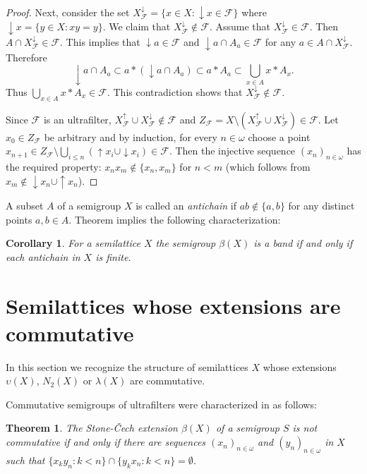 \documentclass{amsart}
\newtheorem{theorem}[lem]{Theorem}
\newtheorem{corollary}[lem]{Corollary}
\theoremstyle{definition}
\begin{document}
\begin{proof}
Next, consider the set $X^{\downarrow}_{\mathcal {F}}=\{x\in X:
{\downarrow}x\in{\mathcal {F}}\}$ where ${\downarrow}x=\{y\in X:xy=y\}$. We claim that
$X^{\downarrow}_{\mathcal {F}}\notin{\mathcal {F}}$. Assume that
$X^{\downarrow}_{\mathcal {F}}\in{\mathcal {F}}$. Then $A\cap X^{\downarrow}_{\mathcal {F}}\in{\mathcal {F}}$.
This implies that ${\downarrow}a\in{\mathcal {F}}$ and ${\downarrow}a\cap
A_a\in{\mathcal {F}}$ for any $a\in A\cap X^{\downarrow}_{\mathcal {F}}$. Therefore
$${\downarrow}a\cap A_a\subset a*({\downarrow}a\cap A_a)\subset a*A_a\subset   \bigcup_{x\in A}x*A_x.$$ Thus
$\bigcup_{x\in A}x{*}A_x\in{\mathcal {F}}$. This contradiction shows that $X^{\downarrow}_{\mathcal {F}}\notin{\mathcal {F}}$.

Since ${\mathcal {F}}$ is an ultrafilter, $X^{\uparrow}_{\mathcal {F}}\cup X^{\downarrow}_{\mathcal {F}}\notin{\mathcal {F}}$ and
$Z_{\mathcal {F}}=X\setminus(X^{\uparrow}_{\mathcal {F}}\cup
X^{\downarrow}_{\mathcal {F}})\in{\mathcal {F}}$. Let $x_0\in Z_{\mathcal {F}}$ be arbitrary and by induction, for every $n\in{\omega}$ choose a point
$x_{n+1}\in Z_{\mathcal {F}}\setminus\bigcup_{i\leq
n}({\uparrow}x_i\cup{\downarrow}x_i)\in{\mathcal {F}}$.
 Then the injective sequence $(x_n)_{n\in{\omega}}$ has the required property:
$x_nx_m\notin\{x_n,x_m\}$ for $n<m$ (which follows from $x_m\notin {\downarrow}x_n\cup{\uparrow}x_n$).
\end{proof}

A subset $A$ of a semigroup $X$ is called an {\em antichain} if $ab\notin\{a,b\}$ for any distinct points $a,b\in A$.
Theorem implies the following characterization:

\begin{corollary} For a semilattice  $X$ the semigroup $\beta(X)$ is a band if and only if each antichain in $X$ is finite.
\end{corollary}

\section{Semilattices whose extensions are commutative}

In this section we recognize the structure of semilattices $X$ whose extensions ${\upsilon}(X)$, $N_2(X)$ or $\lambda(X)$ are commutative.

Commutative semigroups of ultrafilters were characterized in \cite[4.27]{HS} as follows:

\begin{theorem}\label{t2.4} The Stone-\v Cech extension $\beta(X)$ of a semigroup $S$ is not commutative if and only if there are sequences $(x_n)_{n\in{\omega}}$ and $(y_n)_{n\in{\omega}}$ in $X$ such that $\{x_ky_n:k<n\}\cap\{y_kx_n:k<n\}=\emptyset$.
\end{theorem}
\end{document}
